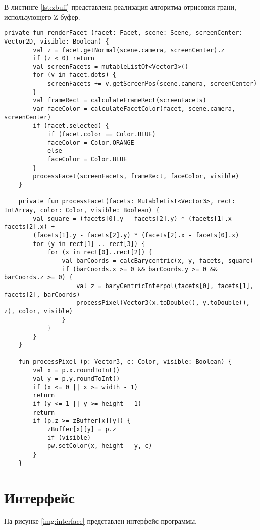 В листинге \ref{lst:zbuff} представлена реализация алгоритма отрисовки грани, использующего Z-буфер.

\begin{lstlisting}[label=lst:zbuff,caption=Реализация алгоритма отрисовки грани\, использующего Z-буффер]
	private fun renderFacet (facet: Facet, scene: Scene, screenCenter: Vector2D, visible: Boolean) {
		val z = facet.getNormal(scene.camera, screenCenter).z
		if (z < 0) return
		val screenFacets = mutableListOf<Vector3>()
		for (v in facet.dots) {
			screenFacets += v.getScreenPos(scene.camera, screenCenter)
		}
		val frameRect = calculateFrameRect(screenFacets)
		var faceColor = calculateFacetColor(facet, scene.camera, screenCenter)
		if (facet.selected) {
			if (facet.color == Color.BLUE)
			faceColor = Color.ORANGE
			else
			faceColor = Color.BLUE
		}
		processFacet(screenFacets, frameRect, faceColor, visible)
	}

	private fun processFacet(facets: MutableList<Vector3>, rect: IntArray, color: Color, visible: Boolean) {
		val square = (facets[0].y - facets[2].y) * (facets[1].x - facets[2].x) +
		(facets[1].y - facets[2].y) * (facets[2].x - facets[0].x)
		for (y in rect[1] .. rect[3]) {
			for (x in rect[0]..rect[2]) {
				val barCoords = calcBarycentric(x, y, facets, square)
				if (barCoords.x >= 0 && barCoords.y >= 0 && barCoords.z >= 0) {
					val z = baryCentricInterpol(facets[0], facets[1], facets[2], barCoords)
					processPixel(Vector3(x.toDouble(), y.toDouble(), z), color, visible)
				}
			}
		}
	}

	fun processPixel (p: Vector3, c: Color, visible: Boolean) {
		val x = p.x.roundToInt()
		val y = p.y.roundToInt()
		if (x <= 0 || x >= width - 1)
		return
		if (y <= 1 || y >= height - 1)
		return
		if (p.z >= zBuffer[x][y]) {
			zBuffer[x][y] = p.z
			if (visible)
			pw.setColor(x, height - y, c)
		}
	}
\end{lstlisting}

\section{Интерфейс}

На рисунке \ref{img:interface} представлен интерфейс программы.


\FloatBarrier

